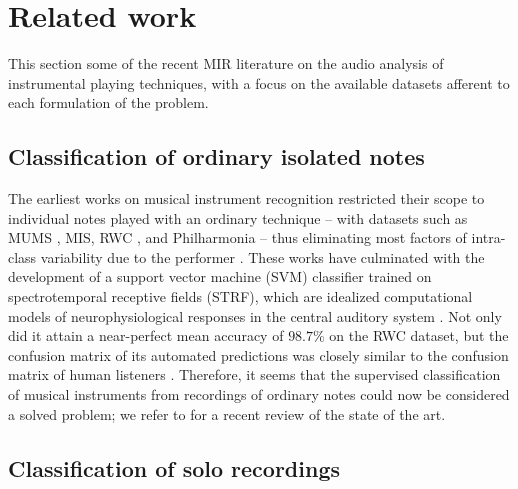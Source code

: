 \documentclass{article}
\begin{document}
\section{Related work}
This section some of the recent MIR literature on the audio analysis of instrumental playing techniques,
with a focus on the available datasets afferent to each formulation of the problem.

\subsection{Classification of ordinary isolated notes}
The earliest works on musical instrument recognition restricted their scope to individual notes played with an ordinary technique -- with datasets such as MUMS \cite{opolko1989dataset}, MIS, RWC \cite{goto2003ismir}, and Philharmonia -- thus eliminating most factors of intra-class variability due to the performer  \cite{martin1998asa,brown1999jasa,eronen2000icassp,herrera2003jnmr,wieczorkowska2003jiis,kaminskyj2005jiis,benetos2006icassp}.
These works have culminated with the development of a support vector machine (SVM) classifier trained on spectrotemporal receptive fields (STRF), which are idealized computational models of neurophysiological responses in the central auditory system \cite{chi2005jasa}.
Not only did it attain a near-perfect mean accuracy of $98.7\%$ on the RWC dataset, but the confusion matrix of its automated predictions was closely similar to the confusion matrix of human listeners \cite{patil2012plos}.
Therefore, it seems that the supervised classification of musical instruments from recordings of ordinary notes could now be considered a solved problem; we refer to \cite{bhalke2016jiis} for a recent review of the state of the art.

\subsection{Classification of solo recordings}
\end{document}
